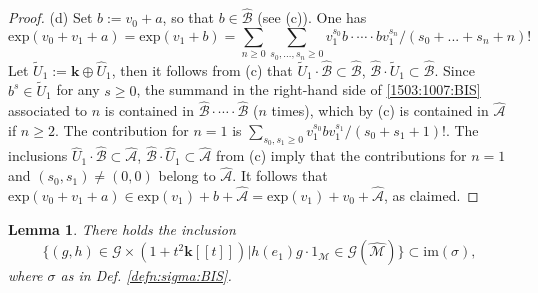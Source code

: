 \documentclass[10pt]{amsart}
\newtheorem{lem}[thm]{Lemma}
\numberwithin{equation}{subsection}
\begin{document}
\begin{proof}
(d) Set $b:=v_0+a$, so that $b \in\hat{\mathcal B}$ (see (c)). One has 
\begin{equation}\label{1503:1007:BIS}
\mathrm{exp}(v_0+v_1+a)=\mathrm{exp}(v_1+b)=\sum_{n\geq 0}\sum_{s_0,\ldots,s_n\geq 0}v_1^{s_0}b\cdot\cdots\cdot bv_1^{s_n}/(s_0+...+s_n+n)!
\end{equation}
Let $\tilde U_1:=\mathbf k\oplus \hat U_1$, then it follows from (c) that $\tilde U_1\cdot\hat{\mathcal B}\subset\hat{\mathcal B}$, 
$\hat{\mathcal B}\cdot\tilde U_1\subset\hat{\mathcal B}$. Since $b^s\in \tilde U_1$ for any $s\geq 0$, the summand in the right-hand side of 
\eqref{1503:1007:BIS} associated to $n$ is contained in $\hat{\mathcal B}\cdot\cdots\cdot 
\hat{\mathcal B}$ ($n$ times), which by (c) is contained in $\hat{\mathcal A}$ if $n\geq 2$. The contribution for $n=1$ is 
$\sum_{s_0,s_1\geq 0} v_1^{s_0}bv_1^{s_1}/(s_0+s_1+1)!$. The inclusions $\hat U_1\cdot\hat{\mathcal B}\subset\hat{\mathcal A}$, 
$\hat{\mathcal B}\cdot\hat U_1\subset\hat{\mathcal A}$ from (c) imply that the contributions for $n=1$ and $(s_0,s_1)\neq (0,0)$ belong 
to $\hat{\mathcal A}$. It follows that $\mathrm{exp}(v_0+v_1+a)\in\mathrm{exp}(v_1)+b+\hat{\mathcal A}=\mathrm{exp}(v_1)+v_0
+\hat{\mathcal A}$, as claimed. 
\end{proof}

\begin{lem}
There holds the inclusion 
\begin{equation}\label{SECONDSTEP:BIS}
\{(g,h)\in \mathcal G\times(1+t^2\mathbf k[[t]]) | h(e_1)g\cdot 1_{\mathcal M}\in\mathcal G(\hat{\mathcal M})\}
\subset\mathrm{im}(\sigma),  
\end{equation}
where $\sigma$ as in Def. \ref{defn:sigma:BIS}. 
\end{lem}
\end{document}

